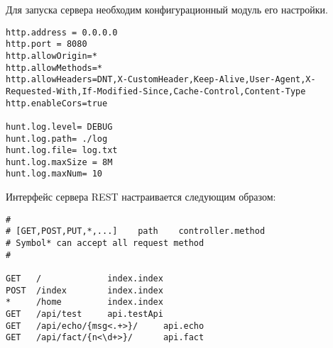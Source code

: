 \documentclass{studrep}
\begin{document}
Для запуска сервера необходим конфигурационный модуль его настройки.
\begin{verbatim}
http.address = 0.0.0.0
http.port = 8080
http.allowOrigin=*
http.allowMethods=*
http.allowHeaders=DNT,X-CustomHeader,Keep-Alive,User-Agent,X-Requested-With,If-Modified-Since,Cache-Control,Content-Type
http.enableCors=true

hunt.log.level= DEBUG
hunt.log.path= ./log
hunt.log.file= log.txt
hunt.log.maxSize = 8M
hunt.log.maxNum= 10
\end{verbatim}

Интерфейс сервера REST настраивается следующим образом:
\begin{verbatim}
#
# [GET,POST,PUT,*,...]    path    controller.method
# Symbol* can accept all request method
#

GET   /             index.index
POST  /index        index.index
*     /home         index.index
GET   /api/test     api.testApi
GET   /api/echo/{msg<.+>}/     api.echo
GET   /api/fact/{n<\d+>}/      api.fact
\end{verbatim}
\end{document}
